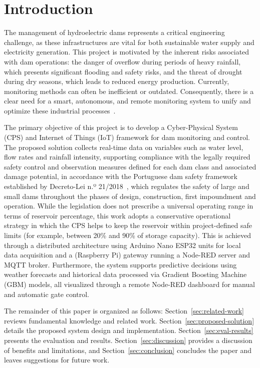 
\section{Introduction}\label{sec:intro}
The management of hydroelectric dams represents a critical engineering challenge, as these infrastructures are vital for both sustainable water supply and electricity generation. This project is motivated by the inherent risks associated with dam operations: the danger of overflow during periods of heavy rainfall, which presents significant flooding and safety risks, and the threat of drought during dry seasons, which leads to reduced energy production. Currently, monitoring methods can often be inefficient or outdated. Consequently, there is a clear need for a smart, autonomous, and remote monitoring system to unify and optimize these industrial processes~\cite{smart_dam_iot}.

The primary objective of this project is to develop a Cyber-Physical System (CPS) and Internet of Things (IoT) framework for dam monitoring and control. The proposed solution collects real-time data on variables such as water level, flow rates and rainfall intensity, supporting compliance with the legally required safety control and observation measures defined for each dam class and associated damage potential, in accordance with the Portuguese dam safety framework established by Decreto-Lei n.º 21/2018~\cite{portuguese_legislation_2018}, which regulates the safety of large and small dams throughout the phases of design, construction, first impoundment and operation. While the legislation does not prescribe a universal operating range in terms of reservoir percentage, this work adopts a conservative operational strategy in which the CPS helps to keep the reservoir within project-defined safe limits (for example, between 20\% and 90\% of storage capacity). This is achieved through a distributed architecture using Arduino Nano ESP32 units for local data acquisition and a (Raspberry Pi) gateway running a Node-RED server and MQTT broker. Furthermore, the system supports predictive decisions using weather forecasts and historical data processed via Gradient Boosting Machine (GBM) models, all visualized through a remote Node-RED dashboard for manual and automatic gate control.

The remainder of this paper is organized as follows: Section~\ref{sec:related-work} reviews fundamental knowledge and related work. Section~\ref{sec:proposed-solution} details the proposed system design and implementation. Section~\ref{sec:eval-results} presents the evaluation and results. Section~\ref{sec:discussion} provides a discussion of benefits and limitations, and Section~\ref{sec:conclusion} concludes the paper and leaves suggestions for future work.
